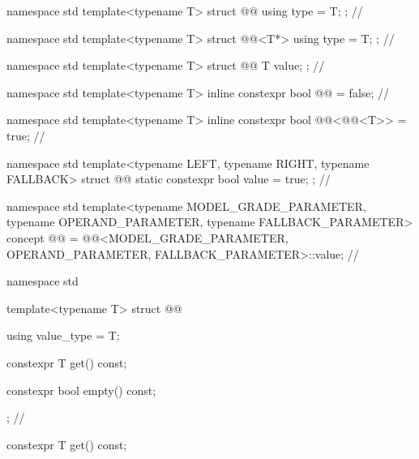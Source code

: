\begin{codeblock}
namespace std {
  template<typename T>
  struct @@ {
    using type = T;
  }; // \expos
}
\end{codeblock}

\begin{codeblock}
namespace std {
  template<typename T>
  struct @@<T*> {
    using type = T;
  }; // \expos
}
\end{codeblock}

\begin{codeblock}
namespace std {
  template<typename T>
  struct @@ {
    T value;
  }; // \expos
}
\end{codeblock}

\begin{codeblock}
namespace std {
  template<typename T> inline constexpr bool @@ = false; // \expos
}
\end{codeblock}

\begin{codeblock}
namespace std {
  template<typename T> inline constexpr bool @@<@@<T>> = true; // \expos
}
\end{codeblock}

\begin{codeblock}
namespace std {
  template<typename LEFT, typename RIGHT, typename FALLBACK>
  struct @@ {
    static constexpr bool value = true;
  }; // \expos
}
\end{codeblock}

\begin{codeblock}
namespace std {
  template<typename MODEL_GRADE_PARAMETER, typename OPERAND_PARAMETER,
           typename FALLBACK_PARAMETER>
  concept @@ =
      @@<MODEL_GRADE_PARAMETER, OPERAND_PARAMETER,
                      FALLBACK_PARAMETER>::value; // \expos
}
\end{codeblock}

\begin{codeblock}
namespace std {
  template<typename T>
  struct @@ {
    using value_type = T;

    constexpr T get() const;

    constexpr bool empty() const;
  }; // \expos
}
\end{codeblock}

%
\begin{itemdecl}
constexpr T get() const;
\end{itemdecl}

